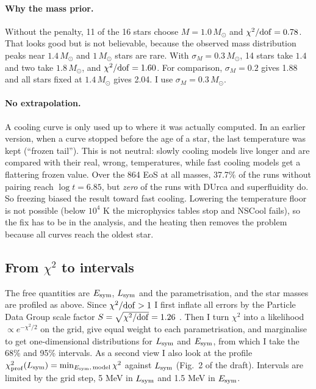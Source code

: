 \documentclass[11pt,a4paper]{article}
\newcommand{\Esym}{E_{\rm sym}}
\newcommand{\Lsym}{L_{\rm sym}}
\newcommand{\Msun}{M_\odot}
\begin{document}
\paragraph{Why the mass prior.} Without the penalty, 11 of the 16 stars choose $M=1.0\,\Msun$ and $\chi^2/{\rm dof}=0.78$. That looks good but is not believable, because the observed mass distribution peaks near $1.4\,\Msun$ \cite{OzelFreire2016} and $1\,\Msun$ stars are rare. With $\sigma_M=0.3\,\Msun$, 14 stars take $1.4$ and two take $1.8\,\Msun$, and $\chi^2/{\rm dof}=1.60$. For comparison, $\sigma_M=0.2$ gives 1.88 and all stars fixed at $1.4\,\Msun$ gives 2.04. I use $\sigma_M=0.3\,\Msun$.

\paragraph{No extrapolation.} A cooling curve is only used up to where it was actually computed. In an earlier version, when a curve stopped before the age of a star, the last temperature was kept (``frozen tail''). This is not neutral: slowly cooling models live longer and are compared with their real, wrong, temperatures, while fast cooling models get a flattering frozen value. Over the 864 EoS at all masses, 37.7\% of the runs without pairing reach $\log t=6.85$, but \emph{zero} of the runs with DUrca and superfluidity do. So freezing biased the result toward fast cooling. Lowering the temperature floor is not possible (below $10^4$ K the microphysics tables stop and NSCool fails), so the fix has to be in the analysis, and the heating then removes the problem because all curves reach the oldest star.

\subsection{From $\chi^2$ to intervals}
The free quantities are $\Esym$, $\Lsym$ and the parametrisation, and the star masses are profiled as above. Since $\chi^2/{\rm dof}>1$ I first inflate all errors by the Particle Data Group scale factor $S=\sqrt{\chi^2/{\rm dof}}=1.26$ \cite{PDG2024}. Then I turn $\chi^2$ into a likelihood $\propto e^{-\chi^2/2}$ on the grid, give equal weight to each parametrisation, and marginalise to get one-dimensional distributions for $\Lsym$ and $\Esym$, from which I take the 68\% and 95\% intervals. As a second view I also look at the profile $\chi^2_{\rm prof}(\Lsym)=\min_{\Esym,\,\rm model}\chi^2$ against $\Lsym$ (Fig.~2 of the draft). Intervals are limited by the grid step, 5 MeV in $\Lsym$ and 1.5 MeV in $\Esym$.
\end{document}
